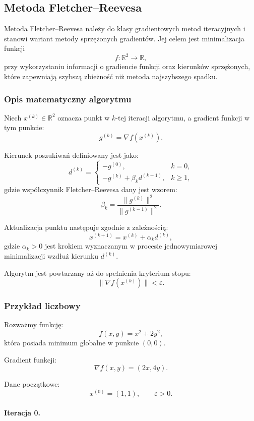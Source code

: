\documentclass[10pt,a4paper]{article}
\begin{document}
\subsection{Metoda Fletcher--Reevesa}

Metoda Fletcher--Reevesa należy do klasy gradientowych metod iteracyjnych
i stanowi wariant metody sprzężonych gradientów.
Jej celem jest minimalizacja funkcji
\[
f:\mathbb{R}^2 \to \mathbb{R},
\]
przy wykorzystaniu informacji o gradiencie funkcji oraz kierunków
sprzężonych, które zapewniają szybszą zbieżność niż metoda najszybszego
spadku.



\subsubsection{Opis matematyczny algorytmu}

Niech $x^{(k)} \in \mathbb{R}^2$ oznacza punkt w $k$-tej iteracji algorytmu,
a gradient funkcji w tym punkcie:
\[
g^{(k)} = \nabla f(x^{(k)}).
\]

Kierunek poszukiwań definiowany jest jako:
\[
d^{(k)} =
\begin{cases}
- g^{(0)}, & k = 0,\\[6pt]
- g^{(k)} + \beta_k d^{(k-1)}, & k \ge 1,
\end{cases}
\]
gdzie współczynnik Fletcher--Reevesa dany jest wzorem:
\[
\beta_k =
\frac{\|g^{(k)}\|^2}{\|g^{(k-1)}\|^2}.
\]

Aktualizacja punktu następuje zgodnie z zależnością:
\[
x^{(k+1)} = x^{(k)} + \alpha_k d^{(k)},
\]
gdzie $\alpha_k > 0$ jest krokiem wyznaczanym w procesie
jednowymiarowej minimalizacji wzdłuż kierunku $d^{(k)}$.

Algorytm jest powtarzany aż do spełnienia kryterium stopu:
\[
\|\nabla f(x^{(k)})\| < \varepsilon.
\]



\subsubsection{Przykład liczbowy}

Rozważmy funkcję:
\[
f(x,y) = x^2 + 2y^2,
\]
która posiada minimum globalne w punkcie $(0,0)$.

Gradient funkcji:
\[
\nabla f(x,y) = (2x, 4y).
\]

Dane początkowe:
\[
x^{(0)} = (1,1), \qquad \varepsilon > 0.
\]



\paragraph{Iteracja 0.}
\end{document}
